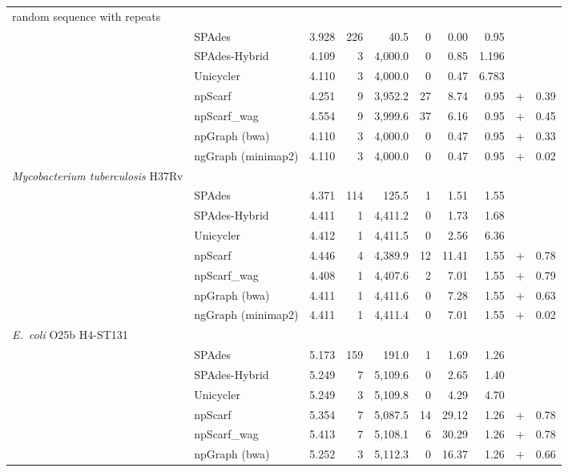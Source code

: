 \documentclass[10pt,twocolumn,twoside]{genpaper}
\newcommand{\ec}{\emph{E.~coli}}
\begin{document}
\begin{longtable}{llcrrrrr@{\hspace{2pt}}c@{\hspace{2pt}}r}
\hline \hline
\endlastfoot

\rowcolor{Gray} \multicolumn{10}{l}
{ random sequence with repeats} \\*  
 & SPAdes  & 3.928 & 226  & 40.5  &  0 &  0.00 &  0.95 &  &  \\*
 & SPAdes-Hybrid  & 4.109 & 3  & 4,000.0  & 0  & 0.85  & 1.196  &  &  \\*
 & Unicycler  & 4.110 & 3  & 4,000.0  &  0 &  0.47 & 6.783  &  &  \\*
 & npScarf  & 4.251 &  9 & 3,952.2  &  27 &  8.74 &  0.95 & + & 0.39 \\*
 & npScarf\_wag & 4.554 & 9  &  3,999.6 &  37 &  6.16 &  0.95 & + &  0.45\\*
 & npGraph (bwa)  & 4.110 & 3  & 4,000.0  & 0  &  0.47 &  0.95 & + &  0.33\\*
 & ngGraph (minimap2)  & 4.110 & 3  & 4,000.0  & 0  & 0.47  &  0.95 & + &  0.02\\
\rowcolor{Gray} \multicolumn{10}{l}
{\emph{Mycobacterium tuberculosis} H37Rv} \\*  
 & SPAdes  & 4.371 & 114  &  125.5 &  1 & 1.51  &  1.55 &  &  \\*
 & SPAdes-Hybrid  & 4.411 & 1  & 4,411.2  & 0  & 1.73  & 1.68  &  &  \\*
 & Unicycler  & 4.412 &  1 &  4,411.5 & 0  &  2.56 &  6.36 &  &  \\*
 & npScarf  & 4.446 & 4  & 4,389.9  & 12  &  11.41 & 1.55  & + & 0.78 \\*
 & npScarf\_wag  & 4.408 & 1  & 4,407.6  &  2 &  7.01 & 1.55  & + & 0.79 \\*
 & npGraph (bwa)  & 4.411 &  1 & 4,411.6  &  0 & 7.28  &  1.55 & + & 0.63 \\*
 & ngGraph (minimap2)  & 4.411 & 1 & 4,411.4  &  0 &  7.01 & 1.55  & + &  0.02\\
\rowcolor{Gray} \multicolumn{10}{l}
{\ec{} O25b H4-ST131} \\*  
 & SPAdes  & 5.173 &  159 & 191.0  &  1 &  1.69 & 1.26  &  &  \\*
 & SPAdes-Hybrid  & 5.249 &  7 &  5,109.6 & 0  & 2.65  & 1.40  &  &  \\*
 & Unicycler  & 5.249 &  3 & 5,109.8  &  0 &  4.29 &  4.70 &  &  \\*
 & npScarf  & 5.354 & 7  & 5,087.5  &  14 & 29.12  &  1.26 & + &  0.78\\*
 & npScarf\_wag  & 5.413 &  7 & 5,108.1  & 6  &  30.29 & 1.26  & + & 0.78 \\*
 & npGraph (bwa)  & 5.252 & 3  &  5,112.3 &  0 & 16.37  & 1.26  & + &  0.66\\*

\end{longtable}
\end{document}
